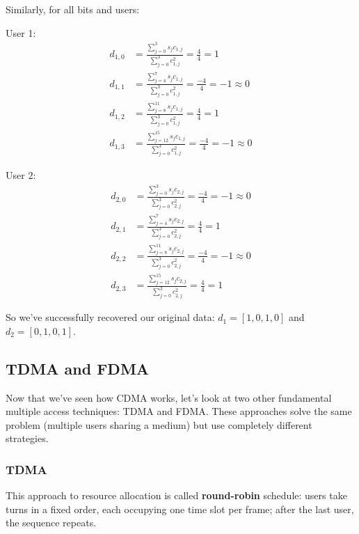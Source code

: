 Similarly, for all bits and users:

User 1:
\begin{align*}
d_{1,0} &= \frac{\sum_{j=0}^{3} s_j c_{1,j}}{\sum_{j=0}^{3} c_{1,j}^2} = \frac{4}{4} = 1 \\
d_{1,1} &= \frac{\sum_{j=4}^{7} s_j c_{1,j}}{\sum_{j=0}^{3} c_{1,j}^2} = \frac{-4}{4} = -1 \approx 0 \\
d_{1,2} &= \frac{\sum_{j=8}^{11} s_j c_{1,j}}{\sum_{j=0}^{3} c_{1,j}^2} = \frac{4}{4} = 1 \\
d_{1,3} &= \frac{\sum_{j=12}^{15} s_j c_{1,j}}{\sum_{j=0}^{3} c_{1,j}^2} = \frac{-4}{4} = -1 \approx 0
\end{align*}

User 2:
\begin{align*}
d_{2,0} &= \frac{\sum_{j=0}^{3} s_j c_{2,j}}{\sum_{j=0}^{3} c_{2,j}^2} = \frac{-4}{4} = -1 \approx 0 \\
d_{2,1} &= \frac{\sum_{j=4}^{7} s_j c_{2,j}}{\sum_{j=0}^{3} c_{2,j}^2} = \frac{4}{4} = 1 \\
d_{2,2} &= \frac{\sum_{j=8}^{11} s_j c_{2,j}}{\sum_{j=0}^{3} c_{2,j}^2} = \frac{-4}{4} = -1 \approx 0 \\
d_{2,3} &= \frac{\sum_{j=12}^{15} s_j c_{2,j}}{\sum_{j=0}^{3} c_{2,j}^2} = \frac{4}{4} = 1
\end{align*}

So we've successfully recovered our original data: $d_1 = [1, 0, 1, 0]$ and $d_2 = [0, 1, 0, 1]$.

\newpage
\subsection{TDMA and FDMA}
\label{subsec:tdma_fdma}

Now that we've seen how CDMA works, let's look at two other fundamental multiple access techniques: TDMA and FDMA. These approaches solve the same problem (multiple users sharing a medium) but use completely different strategies.

\subsubsection{TDMA}
This approach to resource allocation is called \textbf{round-robin} schedule: users take turns in a fixed order, each occupying one time slot per frame; after the last user, the sequence repeats.

